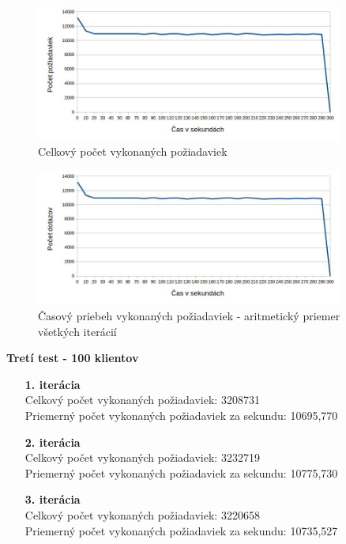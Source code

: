 \documentclass[12pt,oneside,final]{fithesis-utf8}
\begin{document}
\begin{itemize}
\begin{itemize}
\end{itemize}

\begin{figure}[H]
  \centering
      \includegraphics[width=0.9\textwidth]{faban2_2.jpg}
  \caption{Celkový počet vykonaných požiadaviek}
\end{figure}

\begin{figure}[H]
  \centering
      \includegraphics[width=0.9\textwidth]{faban2_2_distr.jpg}
  \caption{Časový priebeh vykonaných požiadaviek - aritmetický priemer všetkých iterácií}
\end{figure}

\textbf{Tretí test - 100 klientov}
\begin{itemize}

\item[\textbf{1. iterácia}]\ \\
Celkový počet vykonaných požiadaviek: 3208731\\
Priemerný počet vykonaných požiadaviek za sekundu: 10695,770

\item[\textbf{2. iterácia}]\ \\
Celkový počet vykonaných požiadaviek: 3232719\\
Priemerný počet vykonaných požiadaviek za sekundu: 10775,730

\item[\textbf{3. iterácia}]\ \\
Celkový počet vykonaných požiadaviek: 3220658\\
Priemerný počet vykonaných požiadaviek za sekundu: 10735,527


\end{itemize}
\end{itemize}
\end{document}

